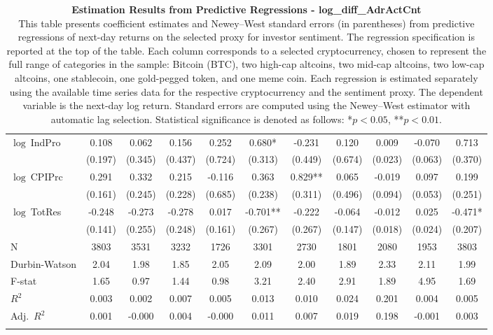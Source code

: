 \begin{table}[ht]
\begin{tabular}{l *{10}{c}}
\addlinespace
$\log\ $IndPro & 0.108 & 0.062 & 0.156 & 0.252 & 0.680* & -0.231 & 0.120 & 0.009 & -0.070 & 0.713 \\
 & (0.197) & (0.345) & (0.437) & (0.724) & (0.313) & (0.449) & (0.674) & (0.023) & (0.063) & (0.370) \\
\addlinespace
$\log\ $CPIPrc & 0.291 & 0.332 & 0.215 & -0.116 & 0.363 & 0.829** & 0.065 & -0.019 & 0.097 & 0.199 \\
 & (0.161) & (0.245) & (0.228) & (0.685) & (0.238) & (0.311) & (0.496) & (0.094) & (0.053) & (0.251) \\
\addlinespace
$\log\ $TotRes & -0.248 & -0.273 & -0.278 & 0.017 & -0.701** & -0.222 & -0.064 & -0.012 & 0.025 & -0.471* \\
 & (0.141) & (0.255) & (0.248) & (0.161) & (0.267) & (0.267) & (0.147) & (0.018) & (0.024) & (0.207) \\
\addlinespace
\midrule
N & 3803 & 3531 & 3232 & 1726 & 3301 & 2730 & 1801 & 2080 & 1953 & 3803 \\
Durbin-Watson & 2.04 & 1.98 & 1.85 & 2.05 & 2.09 & 2.00 & 1.89 & 2.33 & 2.11 & 1.99 \\
F-stat & 1.65 & 0.97 & 1.44 & 0.98 & 3.21 & 2.40 & 2.91 & 1.89 & 4.95 & 1.69 \\
\(R^2\) & 0.003 & 0.002 & 0.007 & 0.005 & 0.013 & 0.010 & 0.024 & 0.201 & 0.004 & 0.005 \\
Adj.\ \(R^2\) & 0.001 & -0.000 & 0.004 & -0.000 & 0.011 & 0.007 & 0.019 & 0.198 & -0.001 & 0.003 \\
\addlinespace
\midrule
\multicolumn{11}{c}{Specification tested: $R_{i,t+1} = \alpha_i + \beta_{sent} S_t + \phi R_{i,t} + \theta B_{i,t} + \gamma M_t + \varepsilon_{i,t+1}$}\\
\bottomrule
\end{tabular}
\caption{\textbf{Estimation Results from Predictive Regressions - log_diff_AdrActCnt} \\
This table presents coefficient estimates and Newey--West standard errors (in parentheses) from predictive regressions of next-day returns on the selected proxy for investor sentiment. The regression specification is reported at the top of the table. Each column corresponds to a selected cryptocurrency, chosen to represent the full range of categories in the sample: Bitcoin (BTC), two high-cap altcoins, two mid-cap altcoins, two low-cap altcoins, one stablecoin, one gold-pegged token, and one meme coin. Each regression is estimated separately using the available time series data for the respective cryptocurrency and the sentiment proxy. The dependent variable is the next-day log return. Standard errors are computed using the Newey--West estimator with automatic lag selection. Statistical significance is denoted as follows: *$p<0.05$, **$p<0.01$.}
\label{tab:log_diff_adractcnt_result_h1}
\end{table}